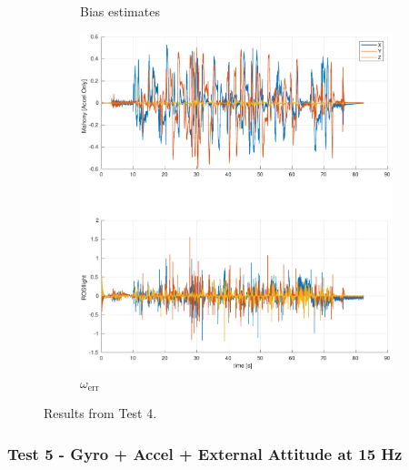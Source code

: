 \documentclass[a4paper]{article}
\begin{document}
\begin{figure}[H]
\begin{subfigure}[t]{0.31\textwidth}
    \caption{Bias estimates}
    \label{fig:scf_est}
  \end{subfigure}\hfill
  \begin{subfigure}[t]{0.31\textwidth}
    \includegraphics[width=\textwidth]{werr_ext15.pdf}
    \caption{$\omega_\text{err}$}
    \label{fig:scf_bode}
  \end{subfigure}
  \caption{Results from Test 4.}
  \label{fig:scf}
\end{figure}

\subsubsection*{Test 5 - Gyro + Accel + External Attitude at 15 Hz}
\end{document}
